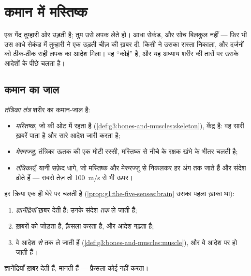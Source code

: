 \chapter{कमान में मस्तिष्क}\label{ch:g5:brain-in-command}

एक गेंद तुम्हारी ओर उड़ती है; तुम उसे लपक लेते हो। आधा सेकंड, और सोच
बिलकुल नहीं --- फिर भी उस आधे सेकंड में तुम्हारी  ने एक उड़ती चीज़
की ख़बर दी, किसी ने उसका रास्ता निकाला, और दर्जनों  को ठीक-ठीक
सही लपक का आदेश मिला। वह ``कोई''  है, और यह अध्याय शरीर की
तारों पर उसके आदेशों के पीछे चलता है।

\section{कमान का जाल}

\begin{definition}[तंत्रिका तंत्र]\label{def:g5:brain-in-command:system}
\emph{तंत्रिका तंत्र} शरीर का कमान-जाल है:
\begin{itemize}
  \item \emph{मस्तिष्क}, जो  की ओट में रहता है
        (\cref{def:g3:bones-and-muscles:skeleton}), केंद्र है: वह
        सारी ख़बरें पाता है और सारे आदेश जारी करता है;
  \item \emph{मेरुरज्जु}, तंत्रिका ऊतक की एक मोटी
        रस्सी, मस्तिष्क से नीचे  के रक्षक खंभे के भीतर चलती है;
  \item \emph{तंत्रिकाएँ}, यानी सफ़ेद धागे, जो
        मस्तिष्क और मेरुरज्जु से निकलकर हर अंग तक जाते हैं और संदेश
        ढोते हैं --- सबसे तेज़ तो \qty{100}{m/s} से भी ऊपर।
\end{itemize}
\end{definition}

\begin{proposition}[ख़बर, फ़ैसला, आदेश]\label{prop:g5:brain-in-command:loop}
हर क्रिया एक ही घेरे पर चलती है
(\cref{prop:g1:the-five-senses:brain} उसका पहला ख़ाका था):
\begin{enumerate}
  \item \emph{ज्ञानेंद्रियाँ} ख़बर देती हैं:  उनके संदेश
         \emph{तक} ले जाती हैं;
  \item \emph{} ख़बरों को जोड़ता है, फ़ैसला करता है, और आदेश
        गढ़ता है;
  \item {} वे आदेश  \emph{से} \emph{} तक ले
        जाती हैं (\cref{def:g3:bones-and-muscles:muscle}), और वे आदेश
        पर  हो जाती हैं।
\end{enumerate}
ज्ञानेंद्रियाँ ख़बर देती हैं,  मानती हैं --- फ़ैसला कोई नहीं करता।
\end{proposition}
\admitted

